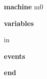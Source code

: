 \begin{block}
  \item   \textbf{machine} m0
  \item   \textbf{variables}
  \begin{block}
    \item   in
  \end{block}
  \item   
  \item   
  \item   \textbf{events}
  \begin{block}
    \item   
    \item   
  \end{block}
  \item   \textbf{end} \\
\end{block}

